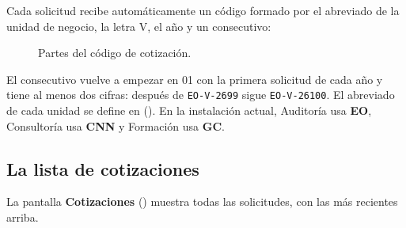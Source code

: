 Cada solicitud recibe automáticamente un código formado por el abreviado de la unidad de
negocio, la letra V, el año y un consecutivo:

\begin{figure}[H]
\centering
{}
\caption{Partes del código de cotización.}\label{fig:codigo}
\end{figure}

\begin{nota}
El consecutivo vuelve a empezar en 01 con la primera solicitud de cada año y tiene al menos
dos cifras: después de \texttt{EO-V-2699} sigue \texttt{EO-V-26100}. El abreviado de cada unidad
se define en  (). En la instalación
actual, Auditoría usa \textbf{EO}, Consultoría usa \textbf{CNN} y Formación usa \textbf{GC}.
\end{nota}

\subsection{La lista de cotizaciones}\label{sec:lista-cotizaciones}

La pantalla \textbf{Cotizaciones} () muestra todas las solicitudes, con las más recientes arriba.

